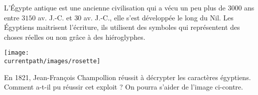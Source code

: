 \begin{enigme}
   \partie[introduction]
      L'Égypte antique est une ancienne civilisation qui a vécu un peu plus de $3000$ ans entre $3150$ av. J.-C. et $30$ av. J.-C., elle s'est développée le long du Nil. Les Égyptiens maitrisent l'écriture, ils utilisent des symboles qui représentent des choses réelles ou non grâce à des hiéroglyphes. \\ [3mm]
      \begin{minipage}{0.4\linewidth}
         \texttt{[image: \\currentpath/images/rosette]}
      \end{minipage}
      \qquad
      \begin{minipage}{0.58\linewidth}
         En 1821, Jean-François Champollion réussit à décrypter les caractères égyptiens. Comment a-t-il pu réussir cet exploit ? On pourra s'aider de l'image ci-contre. \\ [3mm]
         \makebox[\linewidth]{\dotfill} \\ [3mm]
         \makebox[\linewidth]{\dotfill} \\ [3mm]
         \makebox[\linewidth]{\dotfill}
      \end{minipage}

      \bigskip
      

\end{enigme}
